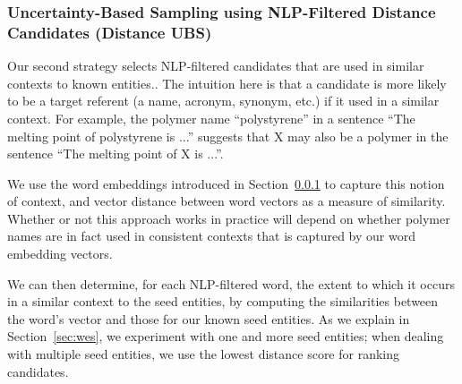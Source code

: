 \subsubsection{Uncertainty-Based Sampling using NLP-Filtered Distance Candidates (Distance UBS)}\label{sec:we}
Our second strategy selects NLP-filtered candidates that are used in similar contexts to known entities..
The intuition here is that a candidate is more likely to be a target referent (a name, acronym, synonym, etc.) if it used in a similar context.
For example, the polymer name ``polystyrene'' in a sentence ``The
melting point of polystyrene is ...'' suggests that X may also be a polymer in the
sentence ``The melting point of X is ...''.

We use the word embeddings introduced in Section~\ref{sec:we} to capture this notion of context,
and vector distance between word vectors as a measure of similarity.
Whether or not this approach works in practice will depend on whether 
polymer names are in fact used in consistent contexts that is captured by our 
word embedding  vectors. 

We can then determine, for each NLP-filtered word, the extent to which it occurs
in a similar context to the seed entities, by computing the similarities
between the word's vector and those for our known seed entities. 
As we explain in Section~\ref{sec:wes}, we experiment with one and more seed entities; 
when dealing with multiple seed entities,
we use the lowest distance score for ranking candidates.

